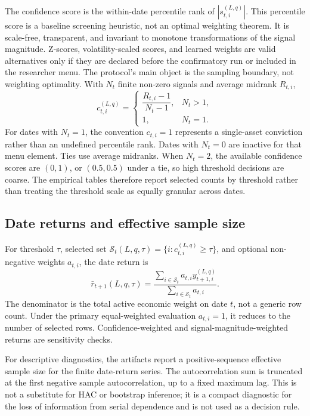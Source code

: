 \documentclass[12pt,a4paper]{article}
\begin{document}
The confidence score is the within-date percentile rank of
\(|s_{t,i}^{(L,q)}|\).  This percentile score is a baseline screening
heuristic, not an optimal weighting theorem.  It is scale-free,
transparent, and invariant to monotone transformations of the signal
magnitude.  Z-scores, volatility-scaled scores, and learned weights are
valid alternatives only if they are declared before the confirmatory run
or included in the researcher menu.  The protocol's main object is the
sampling boundary, not weighting optimality.  With \(N_t\) finite
non-zero signals and average
midrank \(R_{t,i}\),
\begin{equation}
  c_{t,i}^{(L,q)}=
  \begin{cases}
    \dfrac{R_{t,i}-1}{N_t-1}, & N_t>1,\\
    1, & N_t=1 .
  \end{cases}
  \label{eq:confidence}
\end{equation}
For dates with \(N_t=1\), the convention \(c_{t,i}=1\) represents a
single-asset conviction rather than an undefined percentile rank.  Dates
with \(N_t=0\) are inactive for that menu element.  Ties use average
midranks.  When \(N_t=2\), the available confidence scores are
\((0,1)\), or \((0.5,0.5)\) under a tie, so high threshold decisions are
coarse.  The empirical tables therefore report selected counts by
threshold rather than treating the threshold scale as equally granular
across dates.

\subsection{Date returns and effective sample size}

For threshold \(\tau\), selected set
\(\mathcal S_t(L,q,\tau)=\{i:c_{t,i}^{(L,q)}\ge\tau\}\), and optional
non-negative weights \(a_{t,i}\), the date return is
\begin{equation}
  \bar r_{t+1}(L,q,\tau) =
  \frac{\sum_{i\in\mathcal S_t} a_{t,i}y_{t+1,i}^{(L,q)}}
       {\sum_{i\in\mathcal S_t} a_{t,i}} .
  \label{eq:date-return}
\end{equation}
The denominator is the total active economic weight on date \(t\), not a
generic row count.  Under the primary equal-weighted evaluation
\(a_{t,i}=1\), it reduces to the number of selected rows.  Confidence-weighted
and signal-magnitude-weighted returns are sensitivity checks.

For descriptive diagnostics, the artifacts report a positive-sequence
effective sample size for the finite date-return series.  The
autocorrelation sum is truncated at the first negative sample
autocorrelation, up to a fixed maximum lag.  This is not a substitute for
HAC or bootstrap inference; it is a compact diagnostic for the loss of
information from serial dependence and is not used as a decision rule.
\end{document}
